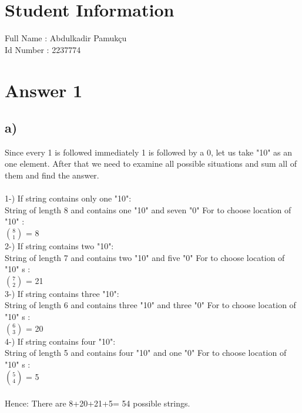 \documentclass[12pt]{article}
\begin{document}
\section*{Student Information } 
Full Name :  Abdulkadir Pamukçu \\
Id Number :  2237774 

\section*{Answer 1}
\subsection*{a)}
Since every 1 is followed immediately 1 is followed by a 0, let us take "10" as an one element. After that we need to examine all possible situations and sum all of them and find the answer.\\
\\
1-) If string contains only one "10":\\
String of length 8 and contains one "10" and seven "0" For to choose location of "10"  :\\
${8 \choose 1}$ = 8 \\ 
2-) If string contains two "10":\\
String of length 7 and contains two "10" and five "0" For to choose location of "10" s :\\
${7 \choose 2}$ = 21 \\ 
3-) If string contains three "10":\\
String of length 6 and contains three "10" and three "0" For to choose location of "10" s :\\
${6 \choose 3}$ = 20 \\ 
4-) If string contains four "10":\\
String of length 5 and contains four "10" and one "0" For to choose location of "10" s :\\
${5 \choose 4}$ = 5 \\ 
\\ Hence: There are 8+20+21+5= 54 possible strings.
\end{document}

